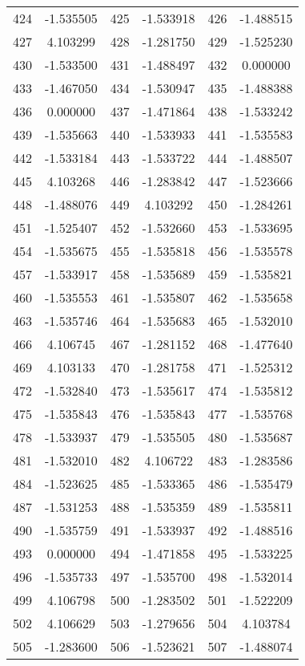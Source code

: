 \documentclass[12pt]{article}
\begin{document}
\begin{longtable}{@{}cc|cc|cc@{}}
424 & -1.535505 & 425 & -1.533918 & 426 & -1.488515 \\
427 & 4.103299 & 428 & -1.281750 & 429 & -1.525230 \\
430 & -1.533500 & 431 & -1.488497 & 432 & 0.000000 \\
433 & -1.467050 & 434 & -1.530947 & 435 & -1.488388 \\
436 & 0.000000 & 437 & -1.471864 & 438 & -1.533242 \\
439 & -1.535663 & 440 & -1.533933 & 441 & -1.535583 \\
442 & -1.533184 & 443 & -1.533722 & 444 & -1.488507 \\
445 & 4.103268 & 446 & -1.283842 & 447 & -1.523666 \\
448 & -1.488076 & 449 & 4.103292 & 450 & -1.284261 \\
451 & -1.525407 & 452 & -1.532660 & 453 & -1.533695 \\
454 & -1.535675 & 455 & -1.535818 & 456 & -1.535578 \\
457 & -1.533917 & 458 & -1.535689 & 459 & -1.535821 \\
460 & -1.535553 & 461 & -1.535807 & 462 & -1.535658 \\
463 & -1.535746 & 464 & -1.535683 & 465 & -1.532010 \\
466 & 4.106745 & 467 & -1.281152 & 468 & -1.477640 \\
469 & 4.103133 & 470 & -1.281758 & 471 & -1.525312 \\
472 & -1.532840 & 473 & -1.535617 & 474 & -1.535812 \\
475 & -1.535843 & 476 & -1.535843 & 477 & -1.535768 \\
478 & -1.533937 & 479 & -1.535505 & 480 & -1.535687 \\
481 & -1.532010 & 482 & 4.106722 & 483 & -1.283586 \\
484 & -1.523625 & 485 & -1.533365 & 486 & -1.535479 \\
487 & -1.531253 & 488 & -1.535359 & 489 & -1.535811 \\
490 & -1.535759 & 491 & -1.533937 & 492 & -1.488516 \\
493 & 0.000000 & 494 & -1.471858 & 495 & -1.533225 \\
496 & -1.535733 & 497 & -1.535700 & 498 & -1.532014 \\
499 & 4.106798 & 500 & -1.283502 & 501 & -1.522209 \\
502 & 4.106629 & 503 & -1.279656 & 504 & 4.103784 \\
505 & -1.283600 & 506 & -1.523621 & 507 & -1.488074 \\

\end{longtable}
\end{document}
